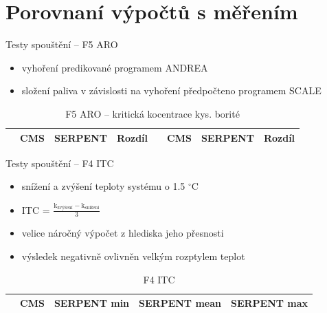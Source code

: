 \documentclass{beamer}
\begin{document}
\section{Porovnaní výpočtů s měřením}


\begin{frame}{Testy spouštění -- F5 ARO}

\begin{itemize}\footnotesize
	\item vyhoření predikované programem ANDREA
	\item složení paliva v závislosti na vyhoření předpočteno programem SCALE 
\end{itemize}

\begin{table}[h]\scriptsize
	\begin{center}
		\begin{tabular}{cccc|cccc}
			\toprule
			& CMS     & SERPENT & Rozdíl & & CMS & SERPENT & Rozdíl \\
			\midrule
			
			\bottomrule
		\end{tabular}
		\caption{\footnotesize F5 ARO -- kritická kocentrace kys. borité}
	\end{center}
\end{table}
\end{frame}

\begin{frame}{Testy spouštění -- F4 ITC}

\begin{itemize}\footnotesize
	\item snížení a zvýšení teploty systému o 1.5 $^\circ$C
\large	\item ITC =  $\frac{\textrm{k}_{\textrm{zvýšení}}-\textrm{k}_{\textrm{snížení}}}{
\textrm{3}}$

\footnotesize	\item velice náročný výpočet z hlediska jeho přesnosti
\item výsledek negativně ovlivněn velkým rozptylem teplot
\end{itemize}

\begin{table}[h]\scriptsize
	\begin{center}
		\begin{tabular}{ccccc}
			\toprule
			& CMS     & SERPENT \tiny min & SERPENT \tiny mean & SERPENT \tiny max\\
			\midrule
			
			\bottomrule
		\end{tabular}
		\caption{\footnotesize F4 ITC}
	\end{center}
\end{table}

\end{frame}
\end{document}
